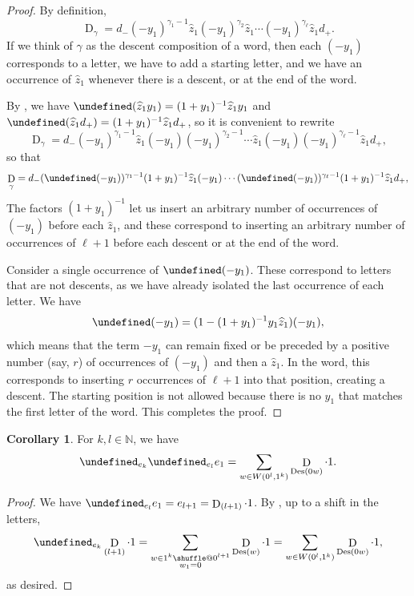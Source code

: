 \documentclass[reqno]{amsart}
\makeatletter
\theoremstyle{plain}
\theoremstyle{definition}
\newtheorem{corollary}[theorem]{Corollary}
\theoremstyle{remark}
\DeclareMathOperator{\D}{D}
\DeclareMathOperator{\Des}{Des}
\newcommand{\z}{\widehat{z}}
\let\oldTheta\Theta
\let\Theta\undefined
\DeclareMathOperator{\Theta}{\oldTheta}
\providecommand*{\shuffle}{%
  \mathbin{\mathpalette\shuffle@{}}%
}
\newcommand*{\shuffle@}[2]{%
  \sbox0{$#1\vcenter{}$}%
  \kern .15\ht0 %
  \rlap{\vrule height .25\ht0 depth 0pt width 2.5\ht0}%
  \raise.1\ht0\hbox to 2.5\ht0{%
    \vrule height 1.75\ht0 depth -.1\ht0 width .17\ht0 %
    \hfill
    \vrule height 1.75\ht0 depth -.1\ht0 width .17\ht0 %
    \hfill
    \vrule height 1.75\ht0 depth -.1\ht0 width .17\ht0 %
  }%
  \kern .15\ht0 %
}
\newcommand{\<}{\langle}
\renewcommand{\>}{\rangle}
\makeatother
\begin{document}
\begin{proof}
    By definition, \[ \D_\gamma = d_- (-y_1)^{\gamma_1-1} \z_1 (-y_1)^{\gamma_2} \z_1 \cdots (-y_1)^{\gamma_\ell} \z_1 d_+. \]
    If we think of $\gamma$ as the descent composition of a word, then each $(-y_1)$ corresponds to a letter, we have to add a starting letter, and we have an occurrence of $\z_1$ whenever there is a descent, or at the end of the word.

    By , we have $\Theta(\z_1 y_1) = (1+y_1)^{-1} \z_1 y_1$ and $\Theta(\z_1 d_+) = (1+y_1)^{-1} \z_1 d_+$, so it is convenient to rewrite
    \[ \D_\gamma = d_- (-y_1)^{\gamma_1-1} \z_1 (-y_1) (-y_1)^{\gamma_2-1} \cdots \z_1 (-y_1) (-y_1)^{\gamma_\ell-1} \z_1 d_+, \] so that
    \[ \D_\gamma = d_- (\Theta(-y_1))^{\gamma_1-1} (1+y_1)^{-1} \z_1 (-y_1) \cdots (\Theta(-y_1))^{\gamma_\ell-1} (1+y_1)^{-1} \z_1 d_+, \]
    The factors $(1+y_1)^{-1}$ let us insert an arbitrary number of occurrences of $(-y_1)$ before each $\z_1$, and these correspond to inserting an arbitrary number of occurrences of $\ell+1$ before each descent or at the end of the word.

    Consider a single occurrence of $\Theta(-y_1)$. These correspond to letters that are not descents, as we have already isolated the last occurrence of each letter. We have
    \[ \Theta(-y_1) = (1 - (1 + y_1)^{-1} y_1 \z_1) (-y_1), \]
    which means that the term $-y_1$ can remain fixed or be preceded by a positive number (say, $r$) of occurrences of $(-y_1)$ and then a $\z_1$. In the word, this corresponds to inserting $r$ occurrences of $\ell+1$ into that position, creating a descent. The starting position is not allowed because there is no $y_1$ that matches the first letter of the word. This completes the proof.
\end{proof}

\begin{corollary}
    \label{cor:theta_theta_e1}
    For $k, l \in \mathbb{N}$, we have
    \[ \Theta_{e_k} \Theta_{e_l} e_1 = \sum_{w\in W\left(0^l,1^k\right)} \D_{\Des(0w)} \cdot 1. \]
\end{corollary}

\begin{proof}
    We have $\Theta_{e_l} e_1 = e_{l+1} = \D_{(l+1)} \cdot 1$. By , up to a shift in the letters,
    \[ \Theta_{e_k} \D_{(l+1)} \cdot 1 = \sum_{\substack{w \in 1^k \shuffle 0^{l+1} \\ w_1 = 0}} \D_{\Des(w)} \cdot 1 
        = \sum_{w\in W\left(0^l,1^k\right)} \D_{\Des(0w)} \cdot 1, \]
    as desired.
\end{proof}
\end{document}
